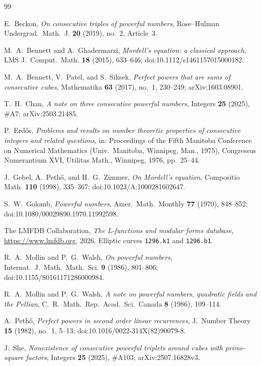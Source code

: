 \documentclass[11pt]{article}
\theoremstyle{remark}
\begin{document}
\begin{thebibliography}{99}

 E.~Beckon, \emph{On consecutive triples of powerful numbers}, Rose--Hulman Undergrad.\ Math.\ J. \textbf{20} (2019), no.~2, Article~3.

 M.~A.~Bennett and A.~Ghadermarzi, \emph{Mordell's equation: a classical approach}, LMS J.\ Comput.\ Math. \textbf{18} (2015), 633--646; doi:10.1112/s1461157015000182.

 M.~A.~Bennett, V.~Patel, and S.~Siksek, \emph{Perfect powers that are sums of consecutive cubes}, Mathematika \textbf{63} (2017), no.~1, 230--249; arXiv:1603.08901.

 T.~H.~Chan, \emph{A note on three consecutive powerful numbers}, Integers \textbf{25} (2025), \#A7; arXiv:2503.21485.

 P.~Erd\H{o}s, \emph{Problems and results on number theoretic properties of consecutive integers and related questions}, in: Proceedings of the Fifth Manitoba Conference on Numerical Mathematics (Univ.\ Manitoba, Winnipeg, Man., 1975), Congressus Numerantium XVI, Utilitas Math., Winnipeg, 1976, pp.~25--44.

 J.~Gebel, A.~Peth\H{o}, and H.~G.~Zimmer, \emph{On Mordell's equation}, Compositio Math. \textbf{110} (1998), 335--367; doi:10.1023/A:1000281602647.

 S.~W.~Golomb, \emph{Powerful numbers}, Amer.\ Math.\ Monthly \textbf{77} (1970), 848--852; doi:10.1080/00029890.1970.11992598.

 The LMFDB Collaboration, \emph{The L-functions and modular forms database}, \url{https://www.lmfdb.org}, 2026. Elliptic curves \texttt{1296.k1} and \texttt{1296.b1}.

 R.~A.~Mollin and P.~G.~Walsh, \emph{On powerful numbers}, Internat.\ J.\ Math.\ Math.\ Sci. \textbf{9} (1986), 801--806; doi:10.1155/S0161171286000984.

 R.~A.~Mollin and P.~G.~Walsh, \emph{A note on powerful numbers, quadratic fields and the Pellian}, C.~R.\ Math.\ Rep.\ Acad.\ Sci.\ Canada \textbf{8} (1986), 109--114.

 A.~Peth\H{o}, \emph{Perfect powers in second order linear recurrences}, J.\ Number Theory \textbf{15} (1982), no.~1, 5--13; doi:10.1016/0022-314X(82)90079-8.

 J.~She, \emph{Nonexistence of consecutive powerful triplets around cubes with prime-square factors}, Integers \textbf{25} (2025), \#A103; arXiv:2507.16828v3.


\end{thebibliography}
\end{document}
